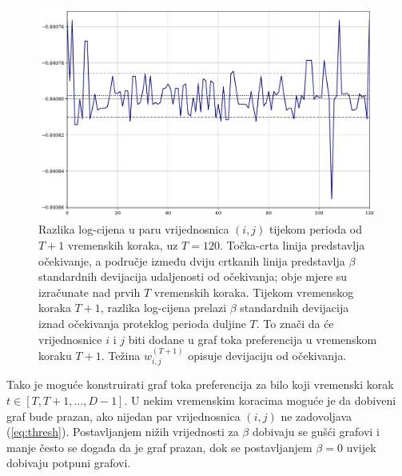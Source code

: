 \documentclass[lmodern, utf8, diplomski, numeric]{fer}
\newcommand{\q}{\left}
\newcommand{\w}{\right}
\begin{document}
  \begin{figure}[htb]
    \centering
    \includegraphics[width=0.9\columnwidth]{graphics/deviation-magnitude.pdf}
    \caption{
       Razlika log-cijena u paru vrijednosnica $(i,j)$ tijekom perioda od $T + 1$ vremenskih koraka, uz $T = 120$.
       Točka-crta linija predstavlja očekivanje, a područje između dviju crtkanih linija predstavlja $\beta$ standardnih devijacija udaljenosti od očekivanja; obje mjere su izračunate nad prvih $T$ vremenskih koraka.
       Tijekom vremenskog koraka $T + 1$, razlika log-cijena prelazi $\beta$ standardnih devijacija iznad očekivanja proteklog perioda duljine $T$.
       To znači da će vrijednosnice $i$ i $j$ biti dodane u graf toka preferencija u vremenskom koraku $T + 1$.
       Težina $w_{i,j}^{(T+1)}$ opisuje devijaciju od očekivanja.
    }
    \label{fig:devmag}
  \end{figure}
  
  Tako je moguće konstruirati graf toka preferencija za bilo koji vremenski korak $t \in \q[T, T + 1, \ldots, D-1\w]$.
  U nekim vremenskim koracima moguće je da dobiveni graf bude prazan, ako nijedan par vrijednosnica $(i,j)$ ne zadovoljava (\ref{eq:thresh}).
  Postavljanjem nižih vrijednosti za $\beta$ dobivaju se gušći grafovi i manje često se događa da je graf prazan, dok se postavljanjem $\beta = 0$ uvijek dobivaju potpuni grafovi.
\end{document}
